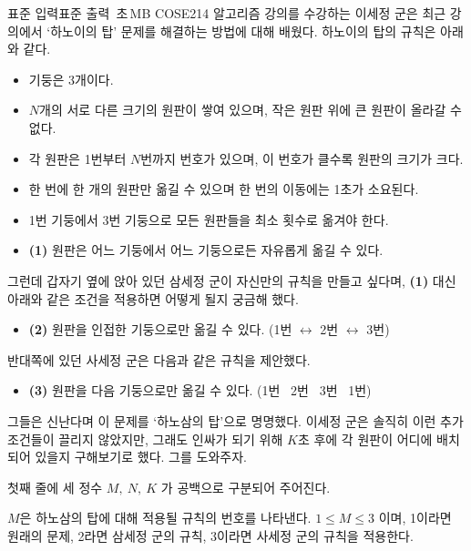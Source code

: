 \begin{problem}{\kcpchanosamtitle}
    {표준 입력}{표준 출력}
    {\kcpchanosamtime\,초}{\kcpchanosammemory\,MB}{}{\kcpchanosamscore}
    COSE214 알고리즘 강의를 수강하는 이세정 군은 최근 강의에서 `하노이의 탑’ 문제를 해결하는 방법에 대해 배웠다. 하노이의 탑의 규칙은 아래와 같다.
    \begin{itemize}
        \item 기둥은 3개이다.
        \item $ N $개의 서로 다른 크기의 원판이 쌓여 있으며, 작은 원판 위에 큰 원판이 올라갈 수 없다.
        \item 각 원판은 1번부터 $ N $번까지 번호가 있으며, 이 번호가 클수록 원판의 크기가 크다.
        \item 한 번에 한 개의 원판만 옮길 수 있으며 한 번의 이동에는 1초가 소요된다.
        \item 1번 기둥에서 3번 기둥으로 모든 원판들을 최소 횟수로 옮겨야 한다.
        \item \textbf{(1)} 원판은 어느 기둥에서 어느 기둥으로든 자유롭게 옮길 수 있다.
    \end{itemize}
        
    그런데 갑자기 옆에 앉아 있던 삼세정 군이 자신만의 규칙을 만들고 싶다며, \textbf{(1)} 대신 아래와 같은 조건을 적용하면 어떻게 될지 궁금해 했다.
    
    \begin{itemize}
        \item \textbf{(2)} 원판을 인접한 기둥으로만 옮길 수 있다. (1번 $ \leftrightarrow $ 2번 $ \leftrightarrow $ 3번)
    \end{itemize}
    반대쪽에 있던 사세정 군은 다음과 같은 규칙을 제안했다.
    
    \begin{itemize}
        \item \textbf{(3)} 원판을 다음 기둥으로만 옮길 수 있다. (1번 \textrightarrow\ 2번 \textrightarrow\ 3번 \textrightarrow\ 1번)
    \end{itemize}    
    
    그들은 신난다며 이 문제를 `하노삼의 탑’으로 명명했다. 이세정 군은 솔직히 이런 추가 조건들이 끌리지 않았지만, 그래도 인싸가 되기 위해 $ K $초 후에 각 원판이 어디에 배치되어 있을지 구해보기로 했다. 그를 도와주자.
    
    \InputFile
    첫째 줄에 세 정수 $ M,\ N,\ K $ 가 공백으로 구분되어 주어진다.
    
    $ M $은 하노삼의 탑에 대해 적용될 규칙의 번호를 나타낸다. $ 1 \leq M \leq 3 $ 이며, 1이라면 원래의 문제, 2라면 삼세정 군의 규칙, 3이라면 사세정 군의 규칙을 적용한다.
    

\end{problem}
